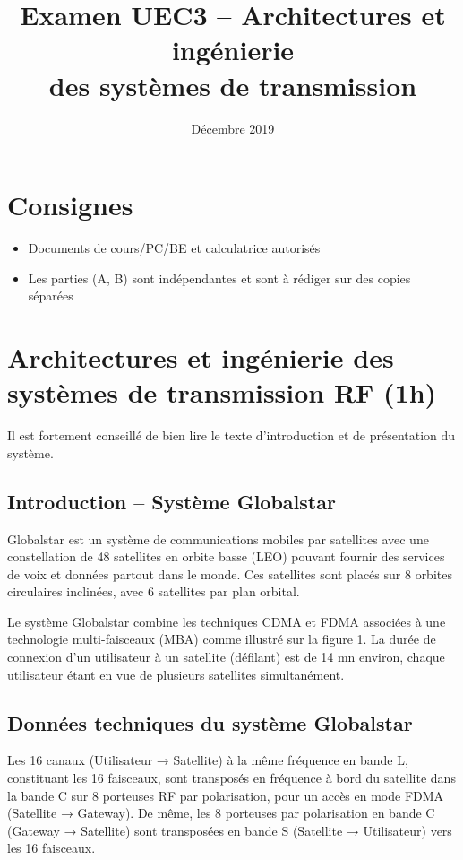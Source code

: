 \documentclass[a4paper,11pt]{article}
\title{\textbf{Examen UEC3 -- Architectures et ingénierie\\des systèmes de transmission}}
\author{Décembre 2019}
\date{}
\begin{document}
\maketitle

\section*{Consignes}
\begin{itemize}
    \item Documents de cours/PC/BE et calculatrice autorisés
    \item Les parties (A, B) sont indépendantes et sont à rédiger sur des copies séparées
\end{itemize}

\section{Architectures et ingénierie des systèmes de transmission RF (1h)}

Il est fortement conseillé de bien lire le texte d'introduction et de présentation du système.

\subsection*{Introduction -- Système Globalstar}

Globalstar est un système de communications mobiles par satellites avec une constellation de 48 satellites en orbite basse (LEO) pouvant fournir des services de voix et données partout dans le monde. Ces satellites sont placés sur 8 orbites circulaires inclinées, avec 6 satellites par plan orbital. 

Le système Globalstar combine les techniques CDMA et FDMA associées à une technologie multi-faisceaux (MBA) comme illustré sur la figure 1. La durée de connexion d'un utilisateur à un satellite (défilant) est de 14 mn environ, chaque utilisateur étant en vue de plusieurs satellites simultanément.

\subsection*{Données techniques du système Globalstar}

Les 16 canaux (Utilisateur → Satellite) à la même fréquence en bande L, constituant les 16 faisceaux, sont transposés en fréquence à bord du satellite dans la bande C sur 8 porteuses RF par polarisation, pour un accès en mode FDMA (Satellite → Gateway). De même, les 8 porteuses par polarisation en bande C (Gateway → Satellite) sont transposées en bande S (Satellite → Utilisateur) vers les 16 faisceaux.
\end{document}
